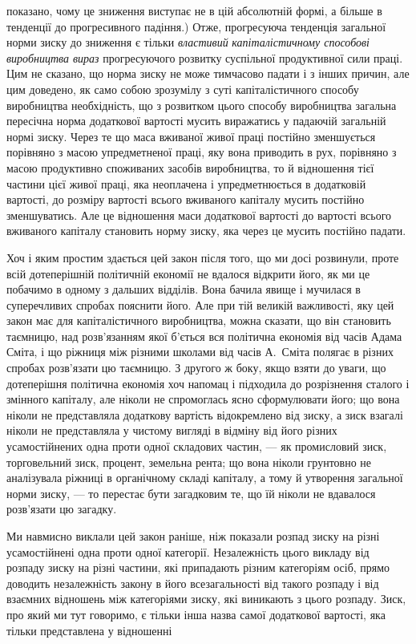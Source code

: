 \parcont{}  %
показано, чому це зниження виступає не в цій абсолютній формі,
а більше в тенденції до прогресивного падіння.) Отже, прогресуюча
тенденція загальної норми зиску до зниження є тільки
\emph{властивий} \emph{капіталістичному способові виробництва вираз}
прогресуючого розвитку суспільної продуктивної сили праці.
Цим не сказано, що норма зиску не може тимчасово падати і
з інших причин, але цим доведено, як само собою зрозумілу
з суті капіталістичного способу виробництва необхідність, що
з розвитком цього способу виробництва загальна пересічна норма
додаткової вартості мусить виражатись у падаючій загальній
нормі зиску. Через те що маса вживаної живої праці постійно
зменшується порівняно з масою упредметненої праці, яку вона
приводить в рух, порівняно з масою продуктивно споживаних
засобів виробництва, то й відношення тієї частини цієї живої
праці, яка неоплачена і упредметнюється в додатковій вартості,
до розміру вартості всього вживаного капіталу мусить постійно
зменшуватись. Але це відношення маси додаткової вартості до
вартості всього вживаного капіталу становить норму зиску, яка
через це мусить постійно падати.

Хоч і яким простим здається цей закон після того, що ми досі
розвинули, проте всій дотеперішній політичній економії не вдалося
відкрити його, як ми це побачимо в одному з дальших відділів.
Вона бачила явище і мучилася в суперечливих спробах
пояснити його. Але при тій великій важливості, яку цей закон
має для капіталістичного виробництва, можна сказати, що він
становить таємницю, над розв’язанням якої б’ється вся політична
економія від часів Адама Сміта, і що ріжниця між різними школами
від часів А.~Сміта полягає в різних спробах розв’язати цю
таємницю. З другого ж боку, якщо взяти до уваги, що дотеперішня
політична економія хоч напомац і підходила до розрізнення
сталого і змінного капіталу, але ніколи не спромоглась
ясно сформулювати його; що вона ніколи не представляла додаткову
вартість відокремлено від зиску, а зиск взагалі ніколи
не представляла у чистому вигляді в відміну від його різних
усамостійнених одна проти одної складових частин, — як промисловий
зиск, торговельний зиск, процент, земельна рента; що
вона ніколи грунтовно не аналізувала ріжниці в органічному
складі капіталу, а тому й утворення загальної норми зиску, —
то перестає бути загадковим те, що їй ніколи не вдавалося розв’язати
цю загадку.

Ми навмисно виклали цей закон раніше, ніж показали розпад
зиску на різні усамостійнені одна проти одної категорії. Незалежність
цього викладу від розпаду зиску на різні частини,
які припадають різним категоріям осіб, прямо доводить незалежність
закону в його всезагальності від такого розпаду і від
взаємних відношень між категоріями зиску, які виникають з цього
розпаду. Зиск, про який ми тут говоримо, є тільки інша назва
самої додаткової вартості, яка тільки представлена у відношенні
\parbreak{}  %
